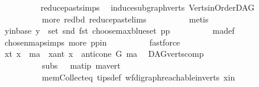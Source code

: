 \begin{isabellebody}
\ \ \ \ \ \ \ \ \isamarkupfalse%
\ reduce{\isacharunderscore}{\kern0pt}past{\isachardot}{\kern0pt}simps\ \isamarkupfalse%
\ induce{\isacharunderscore}{\kern0pt}subgraph{\isacharunderscore}{\kern0pt}verts\ Verts{\isacharunderscore}{\kern0pt}in{\isacharunderscore}{\kern0pt}OrderDAG\ \isanewline
\ \ \ \ \ \ \ \ \ \ more\ red{\isacharunderscore}{\kern0pt}bd\ reduce{\isacharunderscore}{\kern0pt}past{\isachardot}{\kern0pt}elims\isanewline
\ \ \ \ \ \ \ \ \isamarkupfalse%
\ {\isacharparenleft}{\kern0pt}metis{\isacharparenright}{\kern0pt}\isanewline
\ \ \ \ \ \ \isamarkupfalse%
\ \isamarkupfalse%
\ y{\isacharunderscore}{\kern0pt}in{\isacharunderscore}{\kern0pt}base{\isacharcolon}{\kern0pt}\ {\isachardoublequoteopen}y\ {\isasymin}\ set\ {\isacharparenleft}{\kern0pt}snd\ {\isacharparenleft}{\kern0pt}fst\ {\isacharparenleft}{\kern0pt}choose{\isacharunderscore}{\kern0pt}max{\isacharunderscore}{\kern0pt}blue{\isacharunderscore}{\kern0pt}set\ pp{\isacharparenright}{\kern0pt}{\isacharparenright}{\kern0pt}{\isacharparenright}{\kern0pt}{\isachardoublequoteclose}\isanewline
\ \ \ \ \ \ \ \ \isamarkupfalse%
\ ma{\isacharunderscore}{\kern0pt}def\ \isamarkupfalse%
\ chosen{\isacharunderscore}{\kern0pt}map{\isacharunderscore}{\kern0pt}simps{\isacharparenleft}{\kern0pt}{}{\isacharparenright}{\kern0pt}\ more\ pp{\isacharunderscore}{\kern0pt}in\isanewline
\ \ \ \ \ \ \ \ \isamarkupfalse%
\ fastforce\ \isanewline
\ \ \ \ \ \ \isamarkupfalse%
\ {\isacharparenleft}{\kern0pt}x{\isacharunderscore}{\kern0pt}t{\isacharparenright}{\kern0pt}\ {\isachardoublequoteopen}x\ {\isacharequal}{\kern0pt}\ ma{\isachardoublequoteclose}\ {\isacharbar}{\kern0pt}\ {\isacharparenleft}{\kern0pt}x{\isacharunderscore}{\kern0pt}ant{\isacharparenright}{\kern0pt}\ {\isachardoublequoteopen}x\ {\isasymin}\ anticone\ G\ ma{\isachardoublequoteclose}\ \isamarkupfalse%
\ DAG{\isachardot}{\kern0pt}verts{\isacharunderscore}{\kern0pt}comp{}\ \isanewline
\ \ \ \ \ \ \ \ \ \ subs\ {}\ \ ma{\isacharunderscore}{\kern0pt}tip\ ma{\isacharunderscore}{\kern0pt}vert\ \isanewline
\ \ \ \ \ \ \ \ \ \ mem{\isacharunderscore}{\kern0pt}Collect{\isacharunderscore}{\kern0pt}eq\ tips{\isacharunderscore}{\kern0pt}def\ wf{\isacharunderscore}{\kern0pt}digraph{\isachardot}{\kern0pt}reachable{}{\isacharunderscore}{\kern0pt}in{\isacharunderscore}{\kern0pt}verts{\isacharparenleft}{\kern0pt}{}{\isacharparenright}{\kern0pt}\ x{\isacharunderscore}{\kern0pt}in\isanewline

\end{isabellebody}

